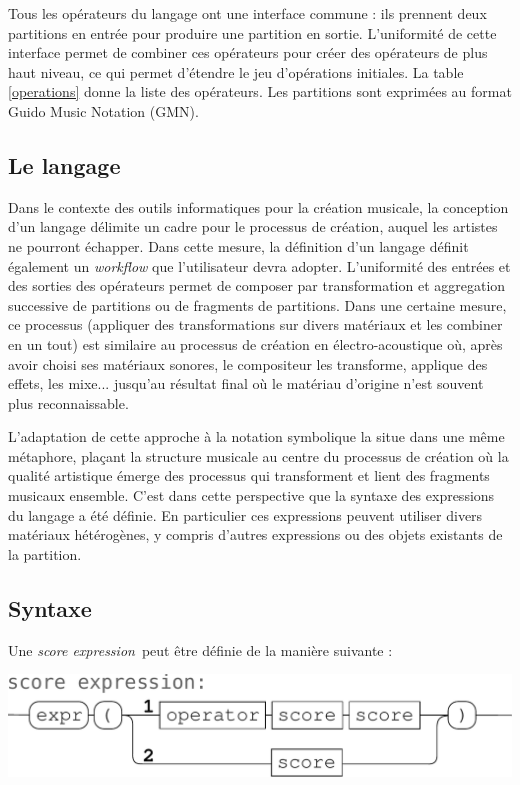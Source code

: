 \documentclass{article}
\newcommand{\sExpr}{\emph{score expression}}
\begin{document}
Tous les opérateurs du langage ont une interface commune : ils prennent deux partitions en entrée pour produire une partition en sortie. L'uniformité de cette interface permet de combiner ces opérateurs pour créer des opérateurs de plus haut niveau, ce qui permet d'étendre le jeu d'opérations initiales. La table \ref{operations} donne la liste des opérateurs.
Les partitions sont exprimées au format Guido Music Notation (GMN)\cite{hoos98}. 


\subsection{Le langage}

Dans le contexte des outils informatiques pour la création musicale, la conception d'un langage délimite un cadre pour le processus de création, auquel les artistes ne pourront échapper. Dans cette mesure, la définition d'un langage définit également un \textit{workflow} que l'utilisateur devra adopter. 
L'uniformité des entrées et des sorties des opérateurs permet de composer par transformation et aggregation successive de partitions ou de fragments de partitions. Dans une certaine mesure, ce processus (appliquer des transformations sur divers matériaux et les combiner en un tout) est similaire au processus de création en électro-acoustique où, après avoir choisi ses matériaux sonores, le compositeur les transforme, applique des effets, les mixe... jusqu'au résultat final où le matériau d'origine n'est souvent plus reconnaissable.

L'adaptation de cette approche à la notation symbolique la situe dans une même métaphore, plaçant la structure musicale au centre du processus de création où la qualité artistique émerge des processus qui transforment et lient des fragments musicaux ensemble.
C'est dans cette perspective que la syntaxe des expressions du langage a été définie. En particulier ces expressions peuvent utiliser divers matériaux hétérogènes, y compris d'autres expressions ou des objets existants de la partition.


\subsection{Syntaxe}
Une \sExpr\ peut être définie de la manière suivante :
\begin{center}
\includegraphics[width=0.9\columnwidth]{imgs/syntax1}
\end{center}
\end{document}
